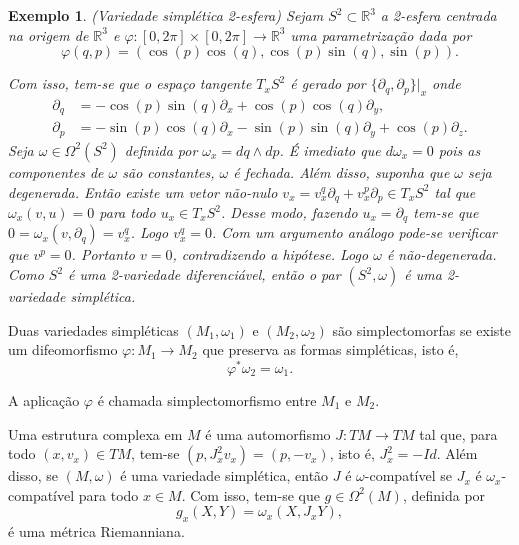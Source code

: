 \documentclass[12pt]{book}
\newtheorem{exemplo}[teorema]{Exemplo}
\newcommand{\derivadaparcialabrev}[1]{\partial_{#1}}
\newcommand{\real}[1]{\mathbb{R}^{#1}}
\begin{document}
	\begin{exemplo}\label{exemplo_variedade_simpletica_esfera}
		(Variedade simplética 2-esfera) Sejam $S^{2} \subset \real{3}$ a 2-esfera centrada na origem de $\real{3}$ e $\varphi:[0,2\pi]\times [0,2\pi] \to \real{3}$ uma parametrização dada por 
		$$
		\varphi(q, p) = (\cos (p) \cos (q), \cos (p) \sin (q), \sin (p)).
		$$
		
		Com isso, tem-se que o espaço tangente $T_{x}S^{2} $ é gerado por $ \{\derivadaparcialabrev{ q}, \derivadaparcialabrev{ p} \}|_{x}$ onde
		$$
		\begin{aligned}
		\derivadaparcialabrev{ q} &= -\cos (p)\sin (q) \derivadaparcialabrev{x}+ \cos (p)\cos (q) \derivadaparcialabrev{y},
		\\
		\derivadaparcialabrev{ p} &=  - \sin (p) \cos (q) 	\derivadaparcialabrev{x} - \sin (p) \sin (q) 	\derivadaparcialabrev{y} +\cos (p)				\derivadaparcialabrev{z}.
		\end{aligned} 
		$$
		Seja $\omega\in \Omega^{2}(S^{2})$ definida por $\omega_{x} = dq \wedge dp$. É imediato que $d\omega_{x} = 0$ pois as componentes de $\omega$ são constantes, $\omega$ é fechada. Além disso, suponha que $\omega$ seja degenerada. Então existe um vetor não-nulo $v_{x} = v^{q}_{x}\partial_{q}+v^{p}_{x}\partial_{p} \in T_{x}S^{2}$ tal que $\omega_{x}(v, u)=0$ para todo $u_{x}\in T_{x}S^{2}$. Desse modo, fazendo $u_{x} = \partial_{q}$ tem-se que $0=\omega_{x}(v, \partial_{q}) = v^{q}_{x}$. Logo $v^{q}_{x}=0$. Com um argumento análogo pode-se verificar que $v^{p}=0$. Portanto $v=0$, contradizendo a hipótese. Logo $\omega$ é não-degenerada. Como $S^{2}$ é uma 2-variedade diferenciável, então o par $(S^{2}, \omega)$ é uma 2-variedade simplética.
	\end{exemplo}
	
	Duas variedades simpléticas $(M_{1}, \omega_{1})$ e $(M_{2}, \omega_{2})$ são simplectomorfas se existe um difeomorfismo $\varphi: M_{1}\to M_{2}$ que preserva as formas simpléticas, isto é,
	$$
	\varphi^{*}\omega_{2}=\omega_{1}.
	$$
	
	A aplicação $\varphi$ é chamada simplectomorfismo entre $M_{1}$ e $M_{2}$.
	
	Uma estrutura complexa em $M$ é uma automorfismo $J:TM \to TM$ tal que, para todo $(x,v_{x})\in TM$, tem-se $(p, J^{2}_{x}v_{x}) = (p, -v_{x})$, isto é, $J^{2}_{x}=-Id$. Além disso, se $(M, \omega)$ é uma variedade simplética, então $J$ é $\omega$-compatível se $J_{x}$ é $\omega_{x}$-compatível para todo $x\in M$. Com isso, tem-se que $g \in \Omega^{2}(M)$, definida por
	$$
	g_{x}(X, Y) =\omega_{x}(X, J_{x}Y),
	$$
	é uma métrica Riemanniana.
\end{document}
